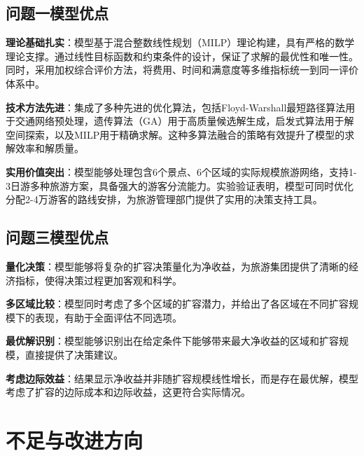 \subsection[\hspace{-2pt}问题一模型优点]{{\heiti{} \hspace{-8pt}问题一模型优点}}\label{subsection5: 问题一模型优点}

\noindent\textbf{理论基础扎实}：模型基于混合整数线性规划（MILP）理论构建，具有严格的数学理论支撑。通过线性目标函数和约束条件的设计，保证了求解的最优性和唯一性。同时，采用加权综合评价方法，将费用、时间和满意度等多维指标统一到同一评价体系中。

\noindent\textbf{技术方法先进}：集成了多种先进的优化算法，包括Floyd-Warshall最短路径算法用于交通网络预处理，遗传算法（GA）用于高质量候选解生成，启发式算法用于解空间探索，以及MILP用于精确求解。这种多算法融合的策略有效提升了模型的求解效率和解质量。

\noindent\textbf{实用价值突出}：模型能够处理包含6个景点、6个区域的实际规模旅游网络，支持1-3日游多种旅游方案，具备强大的游客分流能力。实验验证表明，模型可同时优化分配2-4万游客的路线安排，为旅游管理部门提供了实用的决策支持工具。

\subsection[\hspace{-2pt}问题三模型优点]{{\heiti{} \hspace{-8pt}问题三模型优点}}\label{subsection5: 问题三模型优点}

\noindent\textbf{量化决策}：模型能够将复杂的扩容决策量化为净收益，为旅游集团提供了清晰的经济指标，使得决策过程更加客观和科学。

\noindent\textbf{多区域比较}：模型同时考虑了多个区域的扩容潜力，并给出了各区域在不同扩容规模下的表现，有助于全面评估不同选项。

\noindent\textbf{最优解识别}：模型能够识别出在给定条件下能够带来最大净收益的区域和扩容规模，直接提供了决策建议。

\noindent\textbf{考虑边际效益}：结果显示净收益并非随扩容规模线性增长，而是存在最优解，模型考虑了扩容的边际成本和边际收益，这更符合实际情况。
\section[\hspace{-2pt}不足与改进方向]{{\heiti{} \hspace{-8pt}不足与改进方向}}\label{section5: 不足与改进方向}


